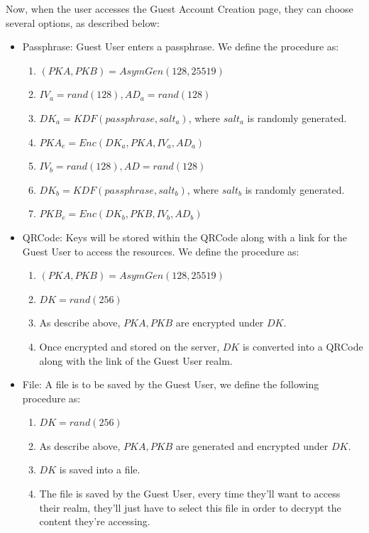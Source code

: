 \documentclass[a4paper,9pt,twoside]{article}
\begin{document}
Now, when the user accesses the Guest Account Creation page, they can choose several 
options, as described below:

\begin{itemize}
\itemsep0em
\item Passphrase: Guest User enters a passphrase. We define the procedure as:
\begin{enumerate}
\item $(PKA, PKB) = AsymGen(128, 25519)$
\item $IV_a=rand(128), AD_a=rand(128)$
\item $DK_a=KDF(passphrase, salt_a)$, where $salt_a$ is randomly generated.
\item $PKA_e=Enc(DK_a, PKA, IV_a, AD_a)$
\item $IV_b=rand(128), AD=rand(128)$
\item $DK_b=KDF(passphrase, salt_b)$, where $salt_b$ is randomly generated.
\item $PKB_e=Enc(DK_b, PKB, IV_b, AD_b)$
\end{enumerate}
\item QRCode: Keys will be stored within the QRCode along with a link for the Guest User 
to access the resources. We define the procedure as:
\begin{enumerate}
\item $(PKA, PKB)=AsymGen(128, 25519)$
\item $DK=rand(256)$
\item As describe above, $PKA,PKB$ are encrypted under $DK$.
\item Once encrypted and stored on the server, $DK$ is 
converted into a QRCode along with the link of the Guest User realm.
\end{enumerate}
\item File: A file is to be saved by the Guest User, we define the following procedure as:
\begin{enumerate}
\item $DK=rand(256)$
\item As describe above, $PKA, PKB$ are generated and encrypted under $DK$.
\item $DK$ is saved into a file.
\item The file is saved by the Guest User, every time they'll want to access their realm, they'll 
just have to select this file in order to decrypt the content they're accessing.
\end{enumerate}
\end{itemize}
\end{document}
